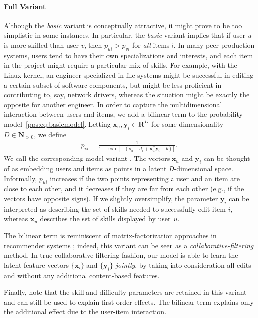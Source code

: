 \paragraph{Full Variant}
Although the \emph{basic} variant is conceptually attractive, it might prove to be too simplistic in some instances.
In particular, the \emph{basic} variant implies that if user $u$ is more skilled than user $v$, then $p_{ui} > p_{vi}$ for \emph{all} items $i$.
In many peer-production systems, users tend to have their own specializations and interests, and each item in the project might require a particular mix of skills.
For example, with the Linux kernel, an engineer specialized in file systems might be successful in editing a certain subset of software components, but might be less proficient in contributing to, say, network drivers, whereas the situation might be exactly the opposite for another engineer.
In order to capture the multidimensional interaction between users and items, we add a bilinear term to the probability model~\eqref{pps:eq:basicmodel}.
Letting $\bm{x}_u, \bm{y}_i \in \mathbf{R}^D$ for some dimensionality $D \in \mathbf{N}_{>0}$, we define
\begin{align}
	\label{pps:eq:fullmodel}
	p_{ui} = \frac{1}{1 + \exp[-(s_u - d_i + \bm{x}_u^\top \bm{y}_i + b)]}.
\end{align}
We call the corresponding model variant .
The vectors $\bm{x}_u$ and $\bm{y}_i$ can be thought of as embedding users and items as points in a latent $D$-dimensional space.
Informally, $p_{ui}$ increases if the two points representing a user and an item are close to each other, and it decreases if they are far from each other (e.g., if the vectors have opposite signs).
If we slightly oversimplify, the parameter $\bm{y}_i$ can be interpreted as describing the set of skills needed to successfully edit item $i$, whereas $\bm{x}_u$ describes the set of skills displayed by user~$u$.

The bilinear term is reminiscent of matrix-factorization approaches in recommender systems \citep{koren2009matrix};
indeed, this variant can be seen as a \emph{collaborative-filtering} method.
In true collaborative-filtering fashion, our model is able to learn the latent feature vectors $\{ \bm{x}_i \}$ and $\{ \bm{y}_i \}$ \emph{jointly}, by taking into consideration all edits and without any additional content-based features.

Finally, note that the skill and difficulty parameters are retained in this variant and can still be used to explain first-order effects.
The bilinear term explains only the additional effect due to the user-item interaction.

